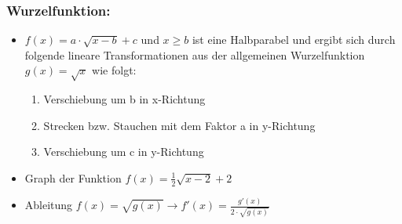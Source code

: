 \documentclass[a4paper,twocolumn,10pt]{onepgnote}
\begin{document}
 \subsubsection{Wurzelfunktion:}
 \begin{itemize}
 \item $f(x) = a\cdot \sqrt{x-b}+c$ und $x\geq b$ ist eine Halbparabel und ergibt sich durch folgende lineare Transformationen aus der allgemeinen Wurzelfunktion $g(x)= \sqrt{x}$ wie folgt:\\
\begin{enumerate}
    \item Verschiebung um b in x-Richtung\\
    \item Strecken bzw. Stauchen mit dem Faktor a in y-Richtung\\
    \item Verschiebung um c in y-Richtung
\end{enumerate}
\item Graph der Funktion $f(x)= \frac{1}{2} \sqrt{x-2}+2$\\
\item Ableitung $f(x)= \sqrt{g(x)} \longrightarrow f'(x) = \frac{g'(x)}{2\cdot \sqrt{g(x)}}$
 \end{itemize}
\end{document}

